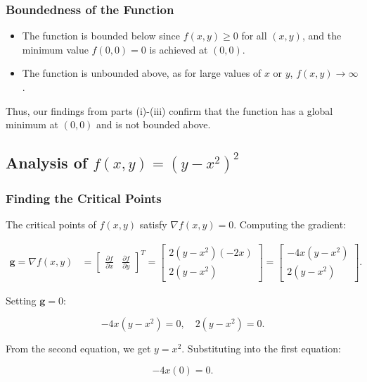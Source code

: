 \documentclass[12pt]{article}
\begin{document}
\subsubsection{Boundedness of the Function}

\begin{itemize}
    \item The function is bounded below since \( f(x,y) \geq 0 \) for all \( (x,y) \), and the minimum value \( f(0,0) = 0 \) is achieved at \( (0,0) \).
    \item The function is unbounded above, as for large values of \( x \) or \( y \), \( f(x,y) \to \infty \).
\end{itemize}

Thus, our findings from parts (i)-(iii) confirm that the function has a global minimum at \( (0,0) \) and is not bounded above.

\subsection{Analysis of \( f(x, y) = (y - x^2)^2 \)}

\subsubsection{Finding the Critical Points}

The critical points of \( f(x, y) \) satisfy \( \nabla f(x, y) = 0 \). Computing the gradient:

\begin{align*}
\mathbf{g} = \nabla f(x, y) &= 
\begin{bmatrix} 
\frac{\partial f}{\partial x} & \frac{\partial f}{\partial y} 
\end{bmatrix}^T 
= \begin{bmatrix} 2(y - x^2)(-2x) \\ 2(y - x^2) \end{bmatrix} 
= \begin{bmatrix} -4x(y - x^2) \\ 2(y - x^2) \end{bmatrix}.
\end{align*}

Setting \( \mathbf{g} = 0 \):

\[
-4x(y - x^2) = 0, \quad 2(y - x^2) = 0.
\]

From the second equation, we get \( y = x^2 \). Substituting into the first equation:

\[
-4x(0) = 0.
\]
\end{document}
